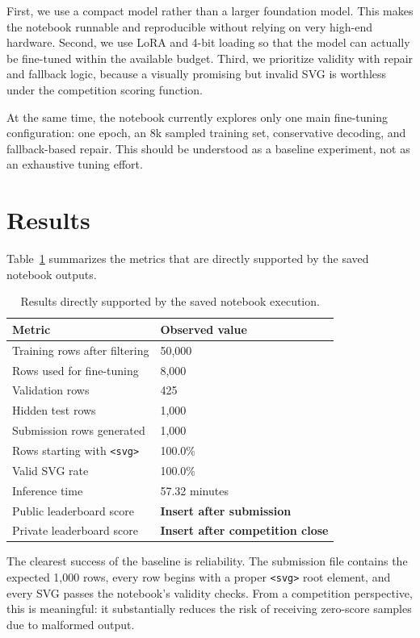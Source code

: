 \documentclass[11pt]{article}
\begin{document}
First, we use a compact model rather than a larger foundation model. This makes the notebook runnable and reproducible without relying on very high-end hardware. Second, we use LoRA and 4-bit loading so that the model can actually be fine-tuned within the available budget. Third, we prioritize validity with repair and fallback logic, because a visually promising but invalid SVG is worthless under the competition scoring function.

At the same time, the notebook currently explores only one main fine-tuning configuration: one epoch, an 8k sampled training set, conservative decoding, and fallback-based repair. This should be understood as a baseline experiment, not as an exhaustive tuning effort.

\section{Results}
Table~\ref{tab:results} summarizes the metrics that are directly supported by the saved notebook outputs.

\begin{table}[t]
\centering
\small
\begin{tabular}{ll}
\toprule
Metric & Observed value \\
\midrule
Training rows after filtering & 50,000 \\
Rows used for fine-tuning & 8,000 \\
Validation rows & 425 \\
Hidden test rows & 1,000 \\
Submission rows generated & 1,000 \\
Rows starting with \texttt{<svg>} & 100.0\% \\
Valid SVG rate & 100.0\% \\
Inference time & 57.32 minutes \\
Public leaderboard score & \textbf{Insert after submission} \\
Private leaderboard score & \textbf{Insert after competition close} \\
\bottomrule
\end{tabular}
\caption{Results directly supported by the saved notebook execution.}
\label{tab:results}
\end{table}

The clearest success of the baseline is reliability. The submission file contains the expected 1,000 rows, every row begins with a proper \texttt{<svg>} root element, and every SVG passes the notebook's validity checks. From a competition perspective, this is meaningful: it substantially reduces the risk of receiving zero-score samples due to malformed output.
\end{document}
